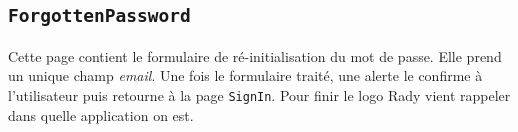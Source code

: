 \documentclass[french]{article}
\begin{document}
		\subsection{\texttt{ForgottenPassword}}
			Cette page contient le formulaire de ré-initialisation du mot de passe. Elle prend un unique champ \textit{email}. Une fois le formulaire traité, une alerte le confirme à l'utilisateur puis retourne à la page \texttt{SignIn}. Pour finir le logo Rady vient rappeler dans quelle application on est. 
		
			
\end{document}

